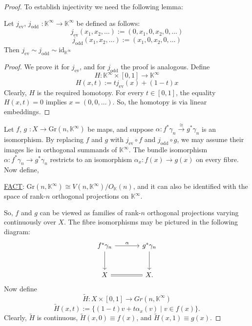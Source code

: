 \documentclass[11pt,a4paper]{article}
\begin{document}
\begin{proof}
    To establish injectivity we need the following lemma:
    \begin{lemma}
        Let $j_{\text{ev}}$, $j_{\text{odd}}$ $: \mathbb{K}^{\infty} \rightarrow \mathbb{K}^{\infty}$ be defined as follows:
        $$j_{\text{ev}}(x_1, x_2, \ldots) := (0, x_1, 0, x_2, 0, \ldots)$$
        $$j_{\text{odd}}(x_1, x_2, \ldots) := (x_1, 0, x_2, 0, \ldots)$$
        Then $j_{\text{ev}} \sim j_{\text{odd}} \sim \text{id}_{\mathbb{K}^{\infty}}$
    \end{lemma}

    \begin{proof}
        We prove it for $j_{\text{ev}}$, and for $j_{\text{odd}}$ the proof is analogous. Define
        $$H: \mathbb{K}^{\infty} \times [0,1] \rightarrow \mathbb{K}^{\infty}$$
        $$H(x,t):= tj_{\text{ev}}(x) + (1-t)x$$
        Clearly, $H$ is the required homotopy. For every $t\in[0,1]$, the equality $H(x,t)=0$ implies $x=(0,0,\ldots)$. So, the homotopy is via linear embeddings.
    \end{proof}


    Let $f$, $g$ $: X\rightarrow \text{Gr}(n, \mathbb{K}^{\infty})$ be maps, and suppose $\alpha: f^*\gamma_n \xrightarrow{\cong} g^*\gamma_n$ is an isomorphism. By replacing $f$ and $g$ with $j_{\text{ev}}\circ f$ and $j_{\text{odd}}\circ g$, we may assume their images lie in orthogonal summands of $\mathbb K^\infty$. The bundle isomorphism $\alpha:f^*\gamma_n\to g^*\gamma_n$ restricts to an isomorphism $\alpha_x:f(x)\to g(x)$ on every fibre. Now define,
    \begin{center}
    \underline{FACT}: $\text{Gr}(n, \mathbb{K}^{\infty}) \cong V(n, \mathbb{K}^{\infty})/O_{\mathbb K}(n)$, and it can also be identified with the space of rank-$n$ orthogonal projections on $\mathbb K^\infty$.
    \end{center}
So, $f$ and $g$ can be viewed as families of rank-$n$ orthogonal projections varying continuously over $X$. The fibre isomorphisms may be pictured in the following diagram:
\[
\begin{tikzcd}[row sep=large,column sep=large]
 f^*\gamma_n \arrow[r,"\alpha"] \arrow[d] & g^*\gamma_n \arrow[d] \\
 X \arrow[r,equal] & X.
\end{tikzcd}
\]
Now define
$$\widetilde{H}: X\times [0,1] \rightarrow Gr(n, \mathbb{K}^{\infty})$$
$$\widetilde{H}(x, t):=\big\{(1-t)v+t\alpha_x(v)\mid v\in f(x)\big\}.$$
Clearly, $\widetilde{H}$ is continuous, $\widetilde{H}(x, 0) \equiv f(x)$, and $\widetilde{H}(x, 1) \equiv g(x)$.


\end{proof}
\end{document}
